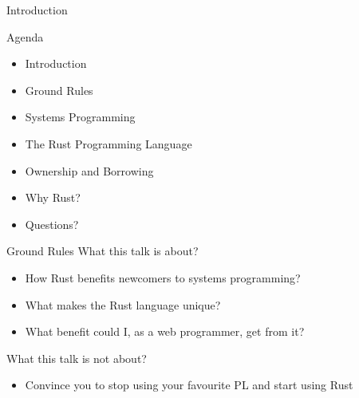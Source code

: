\begin{section}{Introduction}
  \begin{frame}{Agenda}
    \begin{itemize}
    \item Introduction
    \item Ground Rules
    \item Systems Programming
    \item The Rust Programming Language
    \item Ownership and Borrowing
    \item Why Rust?
    \item Questions?
    \end{itemize}
  \end{frame}

  \begin{frame}{Ground Rules}
    What this talk is about?
    \begin{itemize}
    \item How Rust benefits newcomers to systems programming?
    \item What makes the Rust language unique?
    \item What benefit could I, as a web programmer, get from it?
    \end{itemize}

    What this talk is not about?
    \begin{itemize}
    \item Convince you to stop using your favourite PL and start using Rust
    \end{itemize}
  \end{frame}
\end{section}
